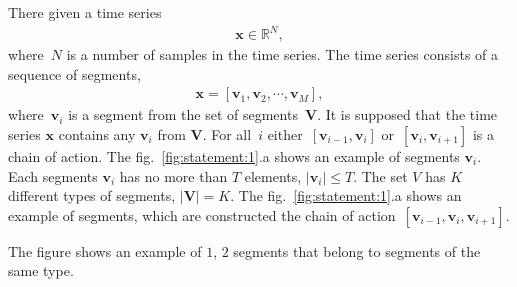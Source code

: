 \documentclass[12pt, twoside]{article}
\numberwithin{equation}{section}
\begin{document}
There given a time series
\begin{equation}
\label{eq:st:1}
\begin{aligned}
\textbf{x} \in \mathbb{R}^{N},
\end{aligned}
\end{equation}
where~$N$ is a number of samples in the time series. The time series consists of a sequence of segments,
\begin{equation}
\label{eq:st:2}
\begin{aligned}
\textbf{x} = [\textbf{v}_1, \textbf{v}_2, \cdots, \textbf{v}_M],
\end{aligned}
\end{equation}
where~$\textbf{v}_i$ is a segment from the set of segments~$\mathbf{V}$. It is supposed that the time series $\textbf{x}$ contains any $\textbf{v}_i$ from $\textbf{V}$.
For all~$i$ either~$[\textbf{v}_{i-1},\textbf{v}_{i}]$ or~$[\textbf{v}_{i},\textbf{v}_{i+1}]$  is a  chain of action. The fig.~\ref{fig:statement:1}.a shows an example of segments $\textbf{v}_i$.
Each segments $\textbf{v}_{i}$ has no more than $T$ elements, $\left|\textbf{v}_{i}\right| \leq T$. The set $V$ has $K$ different types of segments, $\left|\mathbf{V}\right| = K$. The fig.~\ref{fig:statement:1}.a shows an example of segments, which are constructed the chain of action~$[\textbf{v}_{i-1}, \textbf{v}_{i}, \textbf{v}_{i+1}]$.

The figure shows an example of $ 1 $, $ 2 $ segments that belong to segments of the same type.


\end{document}
